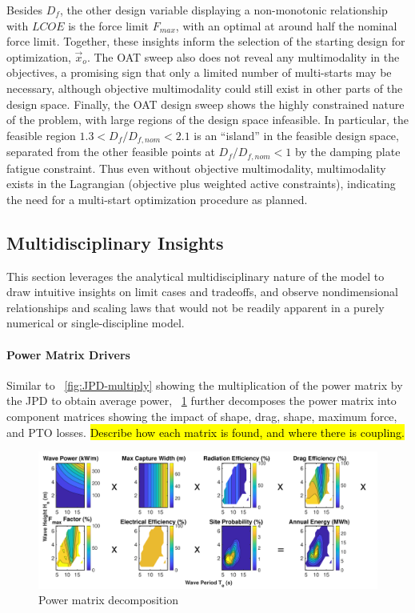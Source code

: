 Besides $D_f$, the other design variable displaying a non-monotonic relationship with $LCOE$ is the force limit $F_{max}$, with an optimal at around half the nominal force limit.
Together, these insights inform the selection of the starting design for optimization, $\vec{x}_o$.
The OAT sweep also does not reveal any multimodality in the objectives, a promising sign that only a limited number of multi-starts may be necessary, although objective multimodality could still exist in other parts of the design space.
Finally, the OAT design sweep shows the highly constrained nature of the problem, with large regions of the design space infeasible.
In particular, the feasible region $1.3<D_f/D_{f,nom}<2.1$ is an ``island'' in the feasible design space, separated from the other feasible points at $D_f/D_{f,nom}<1 $ by the damping plate fatigue constraint.
Thus even without objective multimodality, multimodality exists in the Lagrangian (objective plus weighted active constraints), indicating the need for a multi-start optimization procedure as planned.

\subsection{Multidisciplinary Insights}
This section leverages the analytical multidisciplinary nature of the model to draw intuitive insights on limit cases and tradeoffs, and observe nondimensional relationships and scaling laws that would not be readily apparent in a purely numerical or single-discipline model.

\paragraph{Power Matrix Drivers}
Similar to \figureautorefname~\ref{fig:JPD-multiply} showing the multiplication of the power matrix by the JPD to obtain average power, \figureautorefname~\ref{fig:power-matrix-decomposition} further decomposes the power matrix into component matrices showing the impact of shape, drag, shape, maximum force, and PTO losses.
\hl{Describe how each matrix is found, and where there is coupling.}
\begin{figure}
\centering
\includegraphics[width=\linewidth]{figs/power_matrix_multiply.pdf}
\caption{Power matrix decomposition}
\label{fig:power-matrix-decomposition}
\end{figure}


